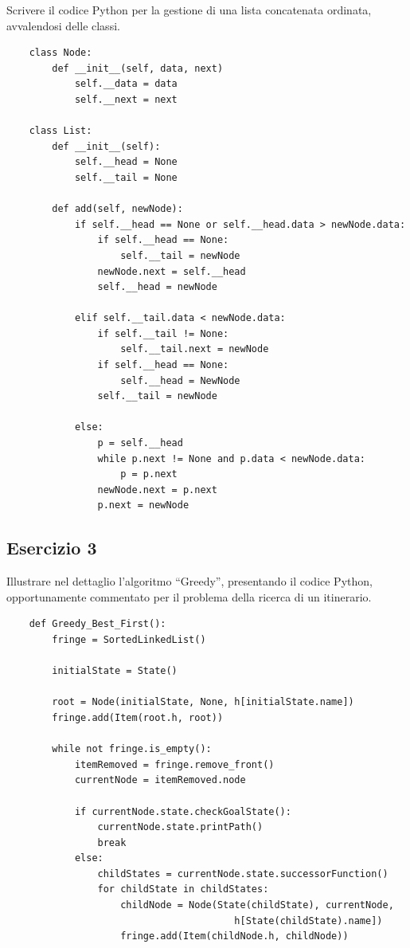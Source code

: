 \documentclass{article}
\numberwithin{equation}{section}
\begin{document}
Scrivere il codice Python per la gestione di una lista concatenata ordinata, avvalendosi delle classi. \\
\begin{verbatim}
    class Node:
        def __init__(self, data, next)
            self.__data = data
            self.__next = next

    class List:
        def __init__(self):
            self.__head = None
            self.__tail = None

        def add(self, newNode):            
            if self.__head == None or self.__head.data > newNode.data:
                if self.__head == None:
                    self.__tail = newNode
                newNode.next = self.__head
                self.__head = newNode

            elif self.__tail.data < newNode.data:
                if self.__tail != None:
                    self.__tail.next = newNode
                if self.__head == None:
                    self.__head = NewNode
                self.__tail = newNode

            else:            
                p = self.__head
                while p.next != None and p.data < newNode.data:
                    p = p.next
                newNode.next = p.next
                p.next = newNode
\end{verbatim}

\subsection*{Esercizio 3}

Illustrare nel dettaglio l'algoritmo ``Greedy'', presentando il codice Python, opportunamente commentato per il problema della ricerca di un 
itinerario. \\
\begin{verbatim}
    def Greedy_Best_First():
        fringe = SortedLinkedList() 

        initialState = State()
        
        root = Node(initialState, None, h[initialState.name])
        fringe.add(Item(root.h, root))
    
        while not fringe.is_empty():
            itemRemoved = fringe.remove_front()
            currentNode = itemRemoved.node

            if currentNode.state.checkGoalState():
                currentNode.state.printPath()
                break
            else: 
                childStates = currentNode.state.successorFunction()
                for childState in childStates:
                    childNode = Node(State(childState), currentNode, 
                                        h[State(childState).name])
                    fringe.add(Item(childNode.h, childNode))
\end{verbatim}
\end{document}
